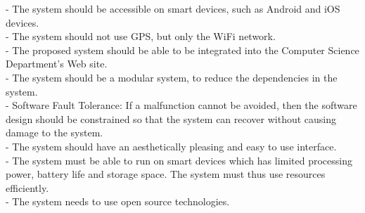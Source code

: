 

- The system should be accessible on smart devices, such as Android and iOS devices.\\
- The system should not use GPS, but only the WiFi network. \\
- The proposed system should be able to be integrated into the Computer Science Department's Web site. \\
- The system should be a modular system, to reduce the dependencies in the system. \\
- Software Fault Tolerance: If a malfunction cannot be avoided, then the software design should be constrained so that the system can recover without causing damage to the system. \\
- The system should have an aesthetically pleasing and easy to use interface. \\
- The system must be able to run on smart devices which has limited processing power, battery life and storage space. The system must thus use resources efficiently. \\
- The system needs to use open source technologies. \\


